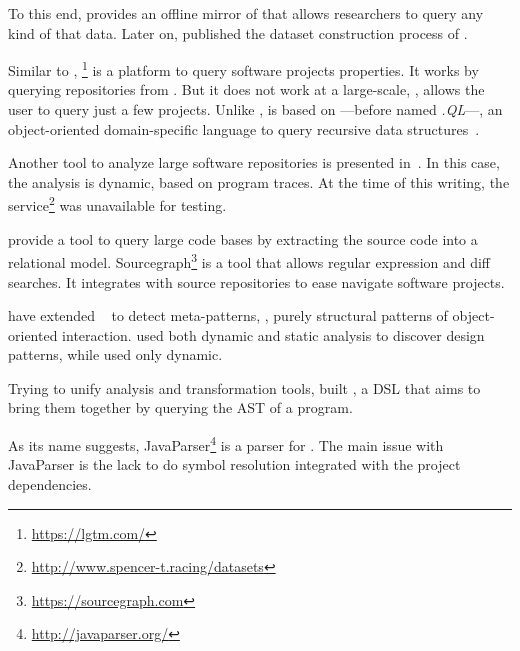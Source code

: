 To this end, \cite{gousiosGHTorentDatasetTool2013} provides an offline mirror of \github{} that allows researchers to query any kind of that data.
Later on, \cite{gousiosLeanGHTorrentGitHub2014} published the dataset construction process of \github{}.

Similar to \boa{}, \lgtm{}\footnote{\url{https://lgtm.com/}} is a platform to query software projects properties.
It works by querying repositories from \github{}.
But it does not work at a large-scale, \ie{}, \lgtm{} allows the user to query just a few projects.
Unlike \boa{}, \lgtm{} is based on \ql{}---before named \emph{.QL}---,
an object-oriented domain-specific language to query recursive data structures~\cite{avgustinovQLObjectorientedQueries2016}.


Another tool to analyze large software repositories is presented in~\cite{brandauerSpencerInteractiveHeap2017}.
In this case, the analysis is dynamic, based on program traces. 
At the time of this writing, the service\footnote{\url{http://www.spencer-t.racing/datasets}} was unavailable for testing. 

\cite{bajracharyaSourcererInternetscaleSoftware2009} provide a tool to query large code bases by extracting the source code into a relational model.
Sourcegraph\footnote{\url{https://sourcegraph.com}} is a tool that allows regular expression and diff searches.
It integrates with source repositories to ease navigate software projects.

\cite{posnettTHEXMiningMetapatterns2010} have extended
\asm{}~\citep{brunetonASMCodeManipulation2002,kuleshovUsingASMFramework2007}
to detect meta-patterns, \ie,
purely structural patterns of object-oriented interaction.
\cite{huDynamicAnalysisDesign2008} used both dynamic and static analysis to discover design patterns, while \cite{arcelliDesignPatternDetection2008} used only dynamic.

Trying to unify analysis and transformation tools,
\cite{vinjuHowMakeBridge2006,klintRASCALDomainSpecific2009} built \rascal,
a DSL that aims to bring them together by querying the AST of a program.

As its name suggests, JavaParser\footnote{\url{http://javaparser.org/}}
is a parser for \java.
The main issue with JavaParser is the lack to do symbol resolution integrated with the project dependencies.


